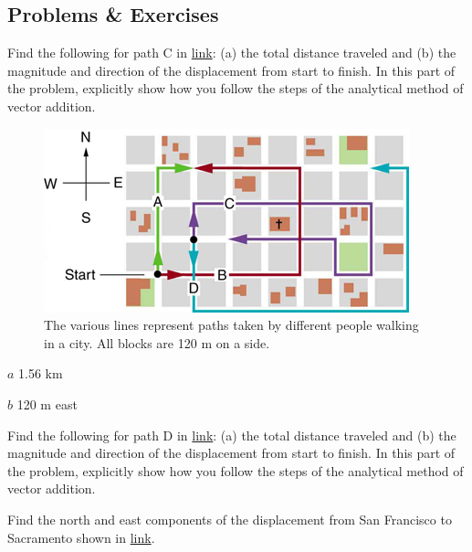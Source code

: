 \documentclass[
]{book}
\newenvironment{problems-exercises}{}{}
\begin{document}
\hypertarget{eip-18}{}
\begin{problems-exercises}

\hypertarget{problems-exercises-7}{%
\subsection{Problems \& Exercises}\label{problems-exercises-7}}

\hypertarget{fs-id1611479}{}
\leavevmode\hypertarget{fs-id1611480}{}%
Find the following for path C in
\protect\hyperlink{import-auto-id1165298863773}{link}: (a) the
total distance traveled and (b) the magnitude and direction of the
displacement from start to finish. In this part of the problem,
explicitly show how you follow the steps of the analytical method of
vector addition.

\begin{figure}
\hypertarget{import-auto-id1165298863773}{%
\centering
\includegraphics{images/Figure_03_02_20a.jpg}
\caption{The various lines represent paths taken by different people walking in
a city. All blocks are 120 m on a
side.}\label{import-auto-id1165298863773}
}
\end{figure}

\leavevmode\hypertarget{eip-id2052721}{}%
\(a\) 1.56 km

\(b\) 120 m east

\hypertarget{fs-id1876099}{}
\leavevmode\hypertarget{fs-id1876100}{}%
Find the following for path D in
\protect\hyperlink{import-auto-id1165298863773}{link}: (a) the
total distance traveled and (b) the magnitude and direction of the
displacement from start to finish. In this part of the problem,
explicitly show how you follow the steps of the analytical method of
vector addition.

\hypertarget{fs-id1751204}{}
\leavevmode\hypertarget{fs-id1751205}{}%
Find the north and east components of the displacement from San
Francisco to Sacramento shown in
\protect\hyperlink{import-auto-id1165298797444}{link}.


\end{problems-exercises}
\end{document}
